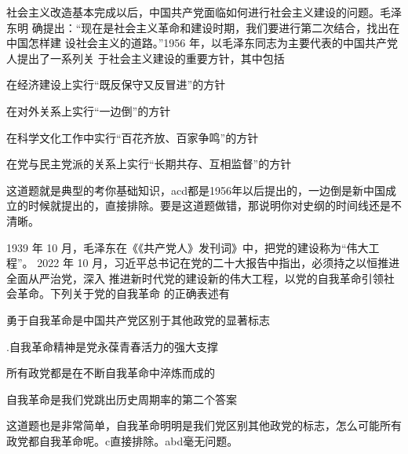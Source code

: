 \documentclass[lang=cn,blue,10pt,scheme=chinese,twocol]{zznote}
\begin{document}
\begin{exercise}社会主义改造基本完成以后，中国共产党面临如何进行社会主义建设的问题。毛泽东明 确提出：“现在是社会主义革命和建设时期，我们要进行第二次结合，找出在 中国怎样建 设社会主义的道路。”1956 年，以毛泽东同志为主要代表的中国共产党人提出了一系列关 于社会主义建设的重要方针，其中包括
	\begin{choice}
		\item 在经济建设上实行“既反保守又反冒进”的方针
		\item 在对外关系上实行“一边倒”的方针
		\item 在科学文化工作中实行“百花齐放、百家争鸣”的方针
		\item 在党与民主党派的关系上实行“长期共存、互相监督”的方针
	\end{choice}
\end{exercise}
\begin{solution}
	这道题就是典型的考你基础知识，acd都是1956年以后提出的，一边倒是新中国成立的时候就提出的，直接排除。要是这道题做错，那说明你对史纲的时间线还是不清晰。
\end{solution}

\begin{exercise}1939 年 10 月，毛泽东在《《共产党人》发刊词》中，把党的建设称为“伟大工程”。 2022 年 10 月，习近平总书记在党的二十大报告中指出，必须持之以恒推进全面从严治党，深入 推进新时代党的建设新的伟大工程，以党的自我革命引领社会革命。下列关于党的自我革命 的正确表述有
	\begin{choice}
		\item 勇于自我革命是中国共产党区别于其他政党的显著标志
		\item .自我革命精神是党永葆青春活力的强大支撑
		\item 所有政党都是在不断自我革命中淬炼而成的
		\item 自我革命是我们党跳出历史周期率的第二个答案
	\end{choice}
\end{exercise}
\begin{solution}
	这道题也是非常简单，自我革命明明是我们党区别其他政党的标志，怎么可能所有政党都自我革命呢。c直接排除。abd毫无问题。
\end{solution}
\end{document}
